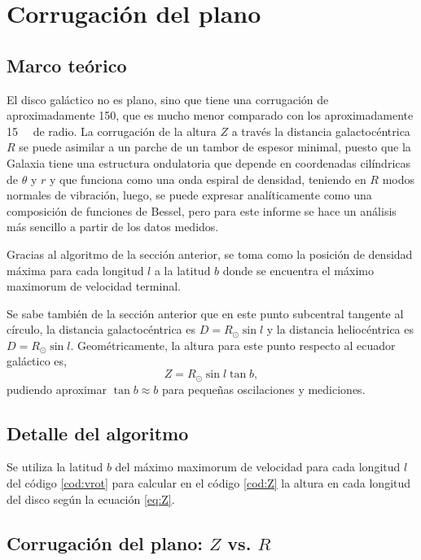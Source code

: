\section{Corrugación del plano}

\subsection{Marco teórico}

El disco galáctico no es plano, sino que tiene una corrugación de aproximadamente \SI{150}{\parsec}, que es mucho menor comparado con los aproximadamente \SI{15}{\kilo\parsec} de radio. La corrugación de la altura $Z$ a través la distancia galactocéntrica $R$ se puede asimilar a un parche de un tambor de espesor minimal, puesto que la Galaxia tiene una estructura ondulatoria que depende en coordenadas cilíndricas de $\theta$ y $r$ y que funciona como una onda espiral de densidad, teniendo en $R$ modos normales de vibración, luego, se puede expresar analíticamente como una composición de funciones de Bessel, pero para este informe se hace un análisis más sencillo a partir de los datos medidos.

Gracias al algoritmo de la sección anterior, se toma como la posición de densidad máxima para cada longitud $l$ a la latitud $b$ donde se encuentra el máximo maximorum de velocidad terminal.

Se sabe también de la sección anterior que en este punto subcentral tangente al círculo, la distancia galactocéntrica es $D=R_\odot\sin l$ y la distancia heliocéntrica es $D=R_\odot\sin l$. Geométricamente, la altura para este punto respecto al ecuador galáctico es,
\begin{equation}
Z=R_\odot\sin l\tan b
,\label{eq:Z}\end{equation}
pudiendo aproximar $\tan b\approx b$ para pequeñas oscilaciones y mediciones.

\subsection{Detalle del algoritmo}

Se utiliza la latitud $b$ del máximo maximorum de velocidad para cada longitud $l$ del código \ref{cod:vrot} para calcular en el código \ref{cod:Z} la altura en cada longitud del disco según la ecuación \ref{eq:Z}. 

\subsection{Corrugación del plano: $Z$ vs. $R$}

